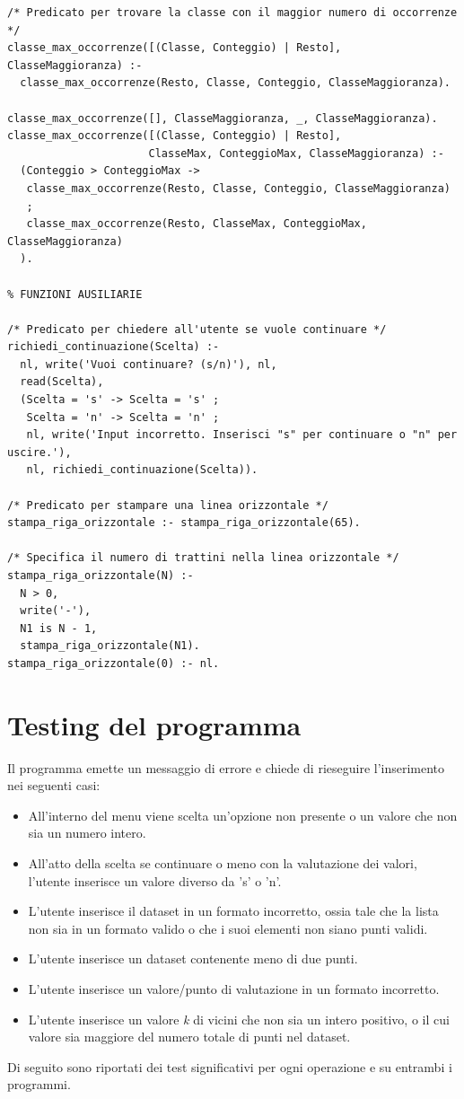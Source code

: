 \documentclass[11pt]{article}
\theoremstyle{definition}
\begin{document}
\begin{verbatim}
/* Predicato per trovare la classe con il maggior numero di occorrenze */
classe_max_occorrenze([(Classe, Conteggio) | Resto], ClasseMaggioranza) :-
  classe_max_occorrenze(Resto, Classe, Conteggio, ClasseMaggioranza).

classe_max_occorrenze([], ClasseMaggioranza, _, ClasseMaggioranza).
classe_max_occorrenze([(Classe, Conteggio) | Resto], 
                      ClasseMax, ConteggioMax, ClasseMaggioranza) :-
  (Conteggio > ConteggioMax ->
   classe_max_occorrenze(Resto, Classe, Conteggio, ClasseMaggioranza)
   ;  
   classe_max_occorrenze(Resto, ClasseMax, ConteggioMax, ClasseMaggioranza)
  ).
	
% FUNZIONI AUSILIARIE	
	
/* Predicato per chiedere all'utente se vuole continuare */
richiedi_continuazione(Scelta) :-
  nl, write('Vuoi continuare? (s/n)'), nl,
  read(Scelta),
  (Scelta = 's' -> Scelta = 's' ;
   Scelta = 'n' -> Scelta = 'n' ;
   nl, write('Input incorretto. Inserisci "s" per continuare o "n" per uscire.'), 
   nl, richiedi_continuazione(Scelta)).

/* Predicato per stampare una linea orizzontale */
stampa_riga_orizzontale :- stampa_riga_orizzontale(65).

/* Specifica il numero di trattini nella linea orizzontale */
stampa_riga_orizzontale(N) :- 
  N > 0, 
  write('-'), 
  N1 is N - 1, 
  stampa_riga_orizzontale(N1).
stampa_riga_orizzontale(0) :- nl.

\end{verbatim}

\newpage

\section{Testing del programma}
\normalsize
Il programma emette un messaggio di errore e chiede di rieseguire l'inserimento nei seguenti casi:
\begin{itemize}
\item All'interno del menu viene scelta un'opzione non presente o un valore che non sia un numero intero.
\item All'atto della scelta se continuare o meno con la valutazione dei valori, l'utente inserisce un valore diverso da 's' o 'n'.
\item L'utente inserisce il dataset in un formato incorretto, ossia tale che la lista non sia in un formato valido o che i suoi elementi non siano punti validi. 
\item L'utente inserisce un dataset contenente meno di due punti.
\item L'utente inserisce un valore/punto di valutazione in un formato incorretto.
\item L'utente inserisce un valore \textit{k} di vicini che non sia un intero positivo, o il cui valore sia maggiore del numero totale di punti nel dataset.
\end{itemize}
Di seguito sono riportati dei test significativi per ogni operazione e su entrambi i programmi. 
\end{document}

